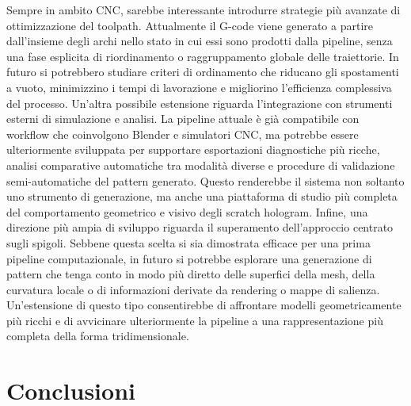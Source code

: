\documentclass[a4paper,11pt,titlepage,twoside]{book}
\newcommand{\1}{\mathbf{1}}
\numberwithin{equation}{chapter}
\theoremstyle{plain}
\theoremstyle{definition}
\begin{document}
	Sempre in ambito CNC, sarebbe interessante introdurre strategie più avanzate di ottimizzazione del toolpath. Attualmente il G-code viene generato a partire dall’insieme degli archi nello stato in cui essi sono prodotti dalla pipeline, senza una fase esplicita di riordinamento o raggruppamento globale delle traiettorie. In futuro si potrebbero studiare criteri di ordinamento che riducano gli spostamenti a vuoto, minimizzino i tempi di lavorazione e migliorino l’efficienza complessiva del processo.
	Un’altra possibile estensione riguarda l’integrazione con strumenti esterni di simulazione e analisi. La pipeline attuale è già compatibile con workflow che coinvolgono Blender e simulatori CNC, ma potrebbe essere ulteriormente sviluppata per supportare esportazioni diagnostiche più ricche, analisi comparative automatiche tra modalità diverse e procedure di validazione semi-automatiche del pattern generato. Questo renderebbe il sistema non soltanto uno strumento di generazione, ma anche una piattaforma di studio più completa del comportamento geometrico e visivo degli scratch hologram.
	Infine, una direzione più ampia di sviluppo riguarda il superamento dell’approccio centrato sugli spigoli. Sebbene questa scelta si sia dimostrata efficace per una prima pipeline computazionale, in futuro si potrebbe esplorare una generazione di pattern che tenga conto in modo più diretto delle superfici della mesh, della curvatura locale o di informazioni derivate da rendering o mappe di salienza. Un’estensione di questo tipo consentirebbe di affrontare modelli geometricamente più ricchi e di avvicinare ulteriormente la pipeline a una rappresentazione più completa della forma tridimensionale.

	
	\chapter{Conclusioni}
	
\end{document}
